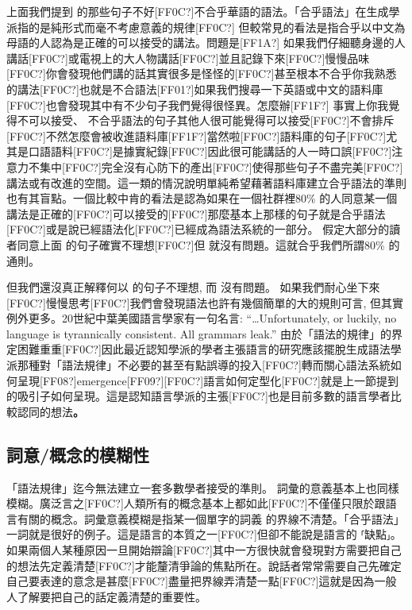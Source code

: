 上面我們提到  的那些句子不好[FF0C?]不合乎華語的語法。「合乎語法」在生成學派指的是純形式而毫不考慮意義的規律[FF0C?] 但較常見的看法是指合乎以中文為母語的人認為是正確的可以接受的講法。問題是[FF1A?] 如果我們仔細聽身邊的人講話[FF0C?]或電視上的大人物講話[FF0C?]並且記錄下來[FF0C?]慢慢品味[FF0C?]你會發現他們講的話其實很多是怪怪的[FF0C?]甚至根本不合乎你我熟悉的講法[FF0C?]也就是不合語法[FF01?]如果我們搜尋一下英語或中文的語料庫[FF0C?]也會發現其中有不少句子我們覺得很怪異。怎麼辦[FF1F?] 事實上你我覺得不可以接受、 不合乎語法的句子其他人很可能覺得可以接受[FF0C?]不會排斥[FF0C?]不然怎麼會被收進語料庫[FF1F?]當然啦[FF0C?]語料庫的句子[FF0C?]尤其是口語語料[FF0C?]是據實紀錄[FF0C?]因此很可能講話的人一時口誤[FF0C?]注意力不集中[FF0C?]完全沒有心防下的產出[FF0C?]使得那些句子不盡完美[FF0C?]講法或有改進的空間。這一類的情況說明單純希望藉著語料庫建立合乎語法的準則也有其盲點。一個比較中肯的看法是認為如果在一個社群裡80\% 的人同意某一個講法是正確的[FF0C?]可以接受的[FF0C?]那麼基本上那樣的句子就是合乎語法[FF0C?]或是說已經語法化[FF0C?]已經成為語法系統的一部分。 假定大部分的讀者同意上面  的句子確實不理想[FF0C?]但  就沒有問題。這就合乎我們所謂80\% 的通則。

但我們還沒真正解釋何以 的句子不理想, 而 沒有問題。 如果我們耐心坐下來[FF0C?]慢慢思考[FF0C?]我們會發現語法也許有幾個簡單的大的規則可言, 但其實例外更多。20世紀中葉美國語言學家\citet[39]{Sapir1921}有一句名言: “…Unfortunately, or luckily, no language is tyrannically consistent. All grammars leak.” 由於「語法的規律」的界定困難重重[FF0C?]因此最近認知學派的學者主張語言的研究應該擺脫生成語法學派那種對「語法規律」不必要的甚至有點誤導的投入[FF0C?]轉而關心語法系統如何呈現[FF08?]emergence[FF09?][FF0C?]語言如何定型化[FF0C?]就是上一節提到的吸引子如何呈現。這是認知語言學派的主張[FF0C?]也是目前多數的語言學者比較認同的想法\textbf{。} 

\subsection{詞意/概念的模糊性}

「語法規律」迄今無法建立一套多數學者接受的準則。 詞彙的意義基本上也同樣模糊。廣泛言之[FF0C?]人類所有的概念基本上都如此[FF0C?]不僅僅只限於跟語言有關的概念。詞彙意義模糊是指某一個單字的詞義 的界線不清楚。「合乎語法」一詞就是很好的例子。這是語言的本質之一[FF0C?]但卻不能說是語言的 ⸢缺點⸥。如果兩個人某種原因一旦開始辯論[FF0C?]其中一方很快就會發現對方需要把自己的想法先定義清楚[FF0C?]才能釐清爭論的焦點所在。說話者常常需要自己先確定自己要表達的意念是甚麼[FF0C?]盡量把界線弄清楚一點[FF0C?]這就是因為一般人了解要把自己的話定義清楚的重要性。   

